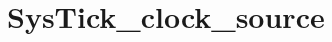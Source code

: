\hypertarget{group___sys_tick__clock__source}{\section{Sys\-Tick\-\_\-clock\-\_\-source}
\label{group___sys_tick__clock__source}
}
